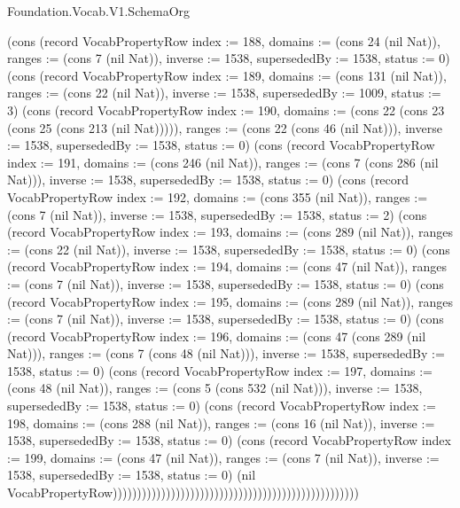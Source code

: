 \begin{lexlean}{Foundation.Vocab.V1.SchemaOrg}
\begin{semanticmodule}
{(cons (record VocabPropertyRow {index := 188, domains := (cons 24 (nil Nat)), ranges := (cons 7 (nil Nat)), inverse := 1538, supersededBy := 1538, status := 0}) (cons (record VocabPropertyRow {index := 189, domains := (cons 131 (nil Nat)), ranges := (cons 22 (nil Nat)), inverse := 1538, supersededBy := 1009, status := 3}) (cons (record VocabPropertyRow {index := 190, domains := (cons 22 (cons 23 (cons 25 (cons 213 (nil Nat))))), ranges := (cons 22 (cons 46 (nil Nat))), inverse := 1538, supersededBy := 1538, status := 0}) (cons (record VocabPropertyRow {index := 191, domains := (cons 246 (nil Nat)), ranges := (cons 7 (cons 286 (nil Nat))), inverse := 1538, supersededBy := 1538, status := 0}) (cons (record VocabPropertyRow {index := 192, domains := (cons 355 (nil Nat)), ranges := (cons 7 (nil Nat)), inverse := 1538, supersededBy := 1538, status := 2}) (cons (record VocabPropertyRow {index := 193, domains := (cons 289 (nil Nat)), ranges := (cons 22 (nil Nat)), inverse := 1538, supersededBy := 1538, status := 0}) (cons (record VocabPropertyRow {index := 194, domains := (cons 47 (nil Nat)), ranges := (cons 7 (nil Nat)), inverse := 1538, supersededBy := 1538, status := 0}) (cons (record VocabPropertyRow {index := 195, domains := (cons 289 (nil Nat)), ranges := (cons 7 (nil Nat)), inverse := 1538, supersededBy := 1538, status := 0}) (cons (record VocabPropertyRow {index := 196, domains := (cons 47 (cons 289 (nil Nat))), ranges := (cons 7 (cons 48 (nil Nat))), inverse := 1538, supersededBy := 1538, status := 0}) (cons (record VocabPropertyRow {index := 197, domains := (cons 48 (nil Nat)), ranges := (cons 5 (cons 532 (nil Nat))), inverse := 1538, supersededBy := 1538, status := 0}) (cons (record VocabPropertyRow {index := 198, domains := (cons 288 (nil Nat)), ranges := (cons 16 (nil Nat)), inverse := 1538, supersededBy := 1538, status := 0}) (cons (record VocabPropertyRow {index := 199, domains := (cons 47 (nil Nat)), ranges := (cons 7 (nil Nat)), inverse := 1538, supersededBy := 1538, status := 0}) (nil VocabPropertyRow)))))))))))))))))))))))))))))))))))))))))))))))))))
}


\end{semanticmodule}
\end{lexlean}
